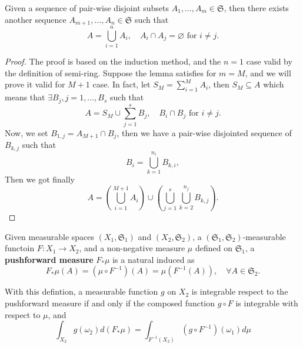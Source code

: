\begin{lemma}
Given a sequence of pair-wise disjoint subsets $A_1,\dots,A_m\in\mathfrak{S}$, then there exists another sequence $A_{m+1},\dots,A_n\in\mathfrak{S}$ such that
\begin{equation}
A=\bigcup_{i=1}^nA_i,\quad A_i\cap A_j=\varnothing\text{ for }i\ne j. 
\end{equation}
\end{lemma}

\begin{proof}
The proof is based on the induction method, and the $n=1$ case valid by the definition of semi-ring. Suppose the lemma satisfies for $m=M$, and we will prove it valid for $M+1$ case. In fact, let $S_{M}=\sum_{i=1}^MA_i$, then $S_M\subseteq A$ which means that $\exists B_j,j=1,\dots,B_s$ such that
\begin{equation}
A=S_M\cup\sum_{j=1}^sB_j,\quad B_i\cap B_j\text{ for }i\ne j.
\end{equation}
Now, we set $B_{1,j}=A_{M+1}\cap B_j$, then we have a pair-wise disjointed sequence of $B_{k,j}$ such that
\begin{equation}
B_i=\bigcup_{k=1}^{n_i}B_{k,i},
\end{equation}
Then we got finally
\begin{equation}
A=\left(\bigcup_{i=1}^{M+1}A_i\right)\cup\left(\bigcup_{j=1}^s\bigcup_{k=2}^{n_j}B_{k,j}\right).
\end{equation}
\end{proof}



\begin{definition}
Given measurable spaces $(X_1,\mathfrak{S}_1)$ and $(X_2,\mathfrak{S}_2)$, a $(\mathfrak{S}_1,\mathfrak{S}_2)$-measurable functoin $F:X_1\to X_2$, and a non-negative measure $\mu$ defined on $\mathfrak{S}_1$, a \textbf{pushforward measure} $F_*\mu$ is a natural induced as
\begin{equation}
F_*\mu(A) = (\mu\circ F^{-1})(A)=\mu\left(F^{-1}(A)\right), \quad \forall A\in\mathfrak{S}_2.
\end{equation} 
\end{definition}
With this defintion, a measurable function $g$ on $X_2$ is integrable respect to the pushforward measure if and only if the composed function $g\circ F$ is integrable with respect to $\mu$, and
\begin{equation}
\int_{X_2}g(\omega_2)d(F_*\mu) = \int_{F^{-1}(X_2)}(g\circ F^{-1})(\omega_1) d\mu
\end{equation}

